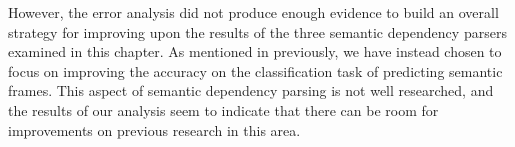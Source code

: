 However, the error analysis did not produce enough evidence to build an overall strategy for improving upon the results of the three semantic dependency parsers examined in this chapter. As mentioned in previously, we have instead chosen to focus on improving the accuracy on the classification task of predicting semantic frames. This aspect of semantic dependency parsing is not well researched, and the results of our analysis seem to indicate that there can be room for improvements on previous research in this area.

